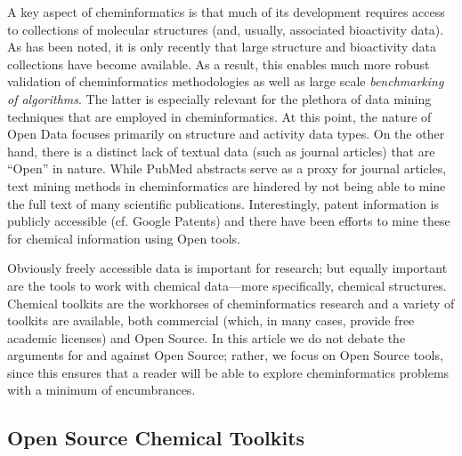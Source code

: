 \documentclass{sig-alternate}
\begin{document}
A key aspect of cheminformatics is that much of its development
requires access to collections of molecular structures (and, usually,
associated bioactivity data). As has been noted, it is only recently
that large structure and bioactivity data collections have become
available. As a result, this enables much more robust validation of
cheminformatics methodologies as well as large scale \emph{benchmarking of
algorithms}. The latter is especially relevant for the plethora of
data mining techniques that are employed in cheminformatics. At this
point, the nature of Open Data focuses primarily on structure and
activity data types. On the other hand, there is a distinct lack of
textual data (such as journal articles) that are ``Open'' in nature. While
PubMed abstracts serve as a proxy for journal articles, text mining
methods in cheminformatics are hindered by not being able to mine the full text of many scientific publications.
Interestingly, patent information is publicly accessible (cf. Google
Patents) and there have been efforts to mine these for chemical
information using Open tools.

Obviously freely accessible data is important for research; but
equally important are the tools to work with chemical data---more
specifically, chemical structures. Chemical toolkits are the workhorses
of cheminformatics research and a variety of toolkits are available,
both commercial (which, in many cases, provide free academic
licenses) and Open Source. In this article we do not debate the
arguments for and against Open Source; rather, we focus on Open Source
tools, since this ensures that a reader will be able to explore
cheminformatics problems with a minimum of encumbrances.

\subsection{Open Source Chemical Toolkits}
\label{sec:toolkits}
\end{document}
